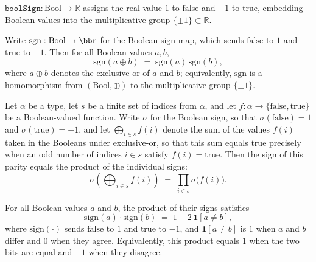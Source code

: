 \begin{definition}
\label{CommunicationComplexity.boolSign}
\leanok
$\texttt{boolSign} : \mathrm{Bool} \to \mathbb{R}$ assigns the real value $1$ to
$\mathrm{false}$ and $-1$ to $\mathrm{true}$, embedding Boolean values into the
multiplicative group $\{\pm 1\} \subset \mathbb{R}$.
\end{definition}

\begin{lemma}
\label{CommunicationComplexity.boolSign_xor}
\leanok
{}
Write $\mathrm{sgn} : \mathrm{Bool} \to \bbr$ for the Boolean sign map, which sends
$\mathrm{false}$ to $1$ and $\mathrm{true}$ to $-1$. Then for all Boolean values $a, b$,
\[
  \mathrm{sgn}(a \oplus b) \;=\; \mathrm{sgn}(a)\,\mathrm{sgn}(b),
\]
where $a \oplus b$ denotes the exclusive-or of $a$ and $b$; equivalently, $\mathrm{sgn}$
is a homomorphism from $(\mathrm{Bool}, \oplus)$ to the multiplicative group $\{\pm
1\}$.
\end{lemma}

\begin{lemma}
\label{CommunicationComplexity.boolSign_sum}
\leanok
{}
Let $\alpha$ be a type, let $s$ be a finite set of indices from $\alpha$, and let $f :
\alpha \to \{\mathrm{false}, \mathrm{true}\}$ be a Boolean-valued function. Write
$\sigma$ for the Boolean sign, so that $\sigma(\mathrm{false}) = 1$ and
$\sigma(\mathrm{true}) = -1$, and let $\bigoplus_{i \in s} f(i)$ denote the sum of the
values $f(i)$ taken in the Booleans under exclusive-or, so that this sum equals
$\mathrm{true}$ precisely when an odd number of indices $i \in s$ satisfy $f(i) =
\mathrm{true}$. Then the sign of this parity equals the product of the individual signs:
\[
\sigma\!\left(\bigoplus_{i \in s} f(i)\right) \;=\; \prod_{i \in s}
\sigma\bigl(f(i)\bigr).
\]
\end{lemma}

\begin{lemma}
\label{CommunicationComplexity.boolSign_mul_boolSign_eq_sub_two_indicator}
\leanok
{}
For all Boolean values $a$ and $b$, the product of their signs satisfies
\[
  \mathrm{sign}(a)\cdot\mathrm{sign}(b) \;=\; 1 - 2\,\mathbf{1}[a \ne b],
\]
where $\mathrm{sign}(\cdot)$ sends $\mathrm{false}$ to $1$ and $\mathrm{true}$ to $-1$,
and $\mathbf{1}[a \ne b]$ is $1$ when $a$ and $b$ differ and $0$ when they agree.
Equivalently, this product equals $1$ when the two bits are equal and $-1$ when they
disagree.
\end{lemma}

